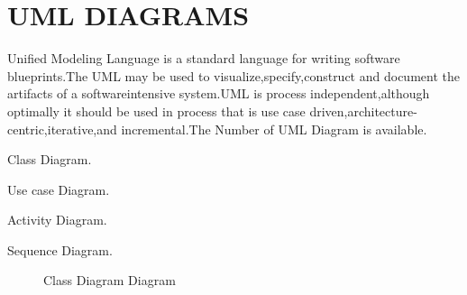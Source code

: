 \documentclass[oneside,a4paper,12pt]{report}
\begin{document}
\section{UML DIAGRAMS} 
\item Uniﬁed Modeling Language is a standard language for writing software blueprints.The UML may be used to visualize,specify,construct and document the artifacts of a softwareintensive system.UML is process independent,although optimally it should be used in process that is use case driven,architecture-centric,iterative,and incremental.The Number of UML Diagram is available.\\

 \item Class Diagram.\\
\item Use case Diagram.\\
 \item Activity Diagram.\\
\item Sequence Diagram.\\



 \begin{center}
	\begin{figure}[!htbp]
		\centering
	  \caption{Class Diagram Diagram}
	  \label{fig:class-dig}
	\end{figure}
\end{center} 
\newpage
\end{document}
